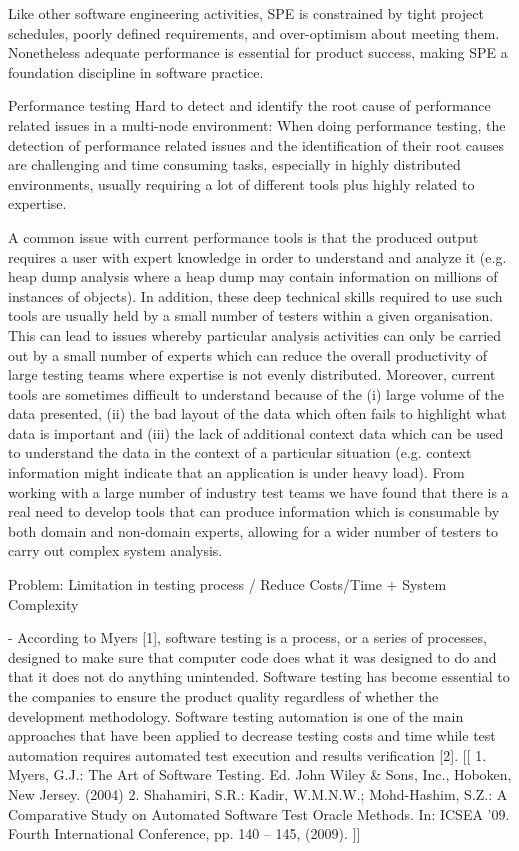 \documentclass[runningheads,a4paper]{llncs}
\begin{document}
Like other software engineering activities, SPE is
constrained by tight project schedules, poorly defined
requirements, and over-optimism about meeting them.
Nonetheless adequate performance is essential for
product success, making SPE a foundation discipline in
software practice.

Performance testing
Hard to detect and identify the root cause of performance related issues in a
multi-node environment: When doing performance testing, the detection of
performance related issues and the identification of their root causes are challenging and time consuming tasks, especially in highly distributed environments,
usually requiring a lot of different tools plus highly related to expertise.

A common issue with current performance tools is that the
produced output requires a user with expert knowledge in order to understand and analyze 
it (e.g. heap dump analysis where a heap dump may contain information on millions of 
instances of objects). In addition, these deep technical skills required to use such 
tools are usually held by a small number of testers within a given organisation. This can 
lead to issues whereby particular analysis activities can only be carried out by a small 
number of experts which can reduce the overall productivity of large testing teams where 
expertise is not evenly distributed. Moreover, current tools are sometimes difficult to 
understand because of the (i) large volume of the data presented, (ii) the bad layout of 
the data which often fails to highlight what data is important and (iii) the lack of 
additional context data which can be used to understand the data in the context of a 
particular situation (e.g. context information might indicate that an application is 
under heavy load). From working with a large number of industry test teams we have found 
that there is a real need to develop tools that can produce information which is 
consumable by both domain and non-domain experts, allowing for a wider number of testers 
to carry out complex system analysis.

Problem: Limitation in testing process / Reduce Costs/Time + System Complexity

- According to Myers [1], software testing is a process, or a series of processes,
designed to make sure that computer code does what it was designed to do and that it
does not do anything unintended. Software testing has become essential to the
companies to ensure the product quality regardless of whether the development
methodology. Software testing automation is one of the main approaches that
have been applied to decrease testing costs and time while test automation
requires automated test execution and results verification [2].
[[
1. Myers, G.J.: The Art of Software Testing. Ed. John Wiley \& Sons, Inc.,
Hoboken, New Jersey. (2004)
2. Shahamiri, S.R.: Kadir, W.M.N.W.; Mohd-Hashim, S.Z.: A Comparative Study on
Automated Software Test Oracle Methods. In: ICSEA '09. Fourth International Conference,
pp. 140 – 145, (2009).
]]
\end{document}
